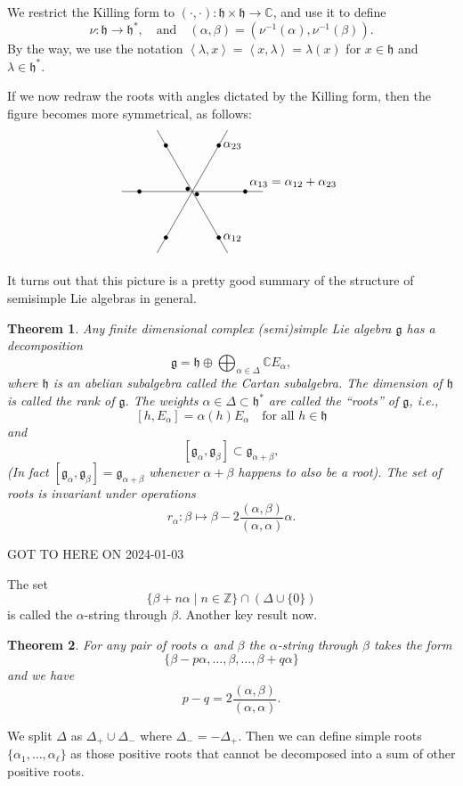 \documentclass[12pt]{article}
\theoremstyle{plain}
\newtheorem{thm}{Theorem}[section]
\theoremstyle{definition}
\numberwithin{equation}{section}
\newcommand{\al}{\alpha}
\newcommand{\la}{\lambda}
\newcommand{\D}{\Delta}
\newcommand{\C}{\mathbb{C}}
\newcommand{\Z}{\mathbb{Z}}
\newcommand{\g}{\mathfrak{g}}
\newcommand{\h}{\mathfrak{h}}
\begin{document}
We restrict the Killing form to $(\cdot, \cdot) : \h \times \h \rightarrow \C$, and use it to define
\[
\nu : \h \rightarrow \h^*, \quad \text{and} \quad (\alpha, \beta) = (\nu^{-1}(\alpha), \nu^{-1}(\beta)).
\]
By the way, we use the notation $\left<\la, x\right> = \left<x, \la\right> = \la(x)$ for $x \in \h$ and $\la \in \h^*$.

If we now redraw the roots with angles dictated by the Killing form, then the figure becomes more symmetrical, as follows:
\[
\begin{tikzpicture}
	\foreach \a in {0,120,240} {
	\draw[fill] (\a:1.5cm) circle (1.5pt) (\a+180:1.5cm) circle (1.5pt);
	\draw[] (\a:2cm) -- (\a+180:2cm);
	}
	\draw[fill] (-30:0.15) circle(1.5pt) (150:0.15) circle(1.5pt);
	\node[anchor = south west] at (0:1.5cm) {$\alpha_{13} = \alpha_{12} + \alpha_{23}$};
	\node[right] at (-60:1.5cm) {$\alpha_{12}$};
	\node[right] at (60:1.5cm) {$\alpha_{23}$};
\end{tikzpicture}
\]

It turns out that this picture is a pretty good summary of the structure of semisimple Lie algebras in general.
\begin{thm}
Any finite dimensional complex (semi)simple Lie algebra $\g$ has a decomposition
\[
\g = \h \oplus \bigoplus_{\alpha \in \D} \C E_\alpha,
\]
where $\h$ is an abelian subalgebra called the Cartan subalgebra. The dimension of $\h$ is called the rank of $\g$. The weights $\alpha \in \D \subset \h^*$ are called the ``roots'' of $\g$, i.e.,
\[
[h, E_\alpha] = \al(h) E_\alpha \quad \text{for all $h \in \h$}
\]
and
\[
[\g_\alpha, \g_\beta] \subset \g_{\alpha+\beta},
\]
(In fact $[\g_\alpha, \g_\beta] = \g_{\alpha+\beta}$ whenever $\alpha+\beta$ happens to also be a root). The set of roots is invariant under operations
\[
r_\alpha : \beta \mapsto \beta - 2\frac{(\alpha, \beta)}{(\alpha, \alpha)} \alpha.
\]
\end{thm}


{\color{red}GOT TO HERE ON 2024-01-03}

The set
\[
\{\beta + n\alpha \mid n \in \Z\} \cap (\Delta \cup \{0\})
\]
is called the $\alpha$-string through $\beta$. Another key result now.
\begin{thm}
For any pair of roots $\alpha$ and $\beta$ the $\alpha$-string through $\beta$ takes the form
\[
\{\beta-p\alpha, \ldots, \beta, \ldots, \beta+q\alpha\}
\]
and we have
\[
p-q = 2\frac{(\alpha, \beta)}{(\alpha, \alpha)}.
\]
\end{thm}
We split $\Delta$ as $\Delta_+ \cup \Delta_-$ where $\Delta_- = -\Delta_+$. Then we can define simple roots $\{\al_1, \ldots, \al_\ell\}$ as those positive roots that cannot be decomposed into a sum of other positive roots.
\end{document}

